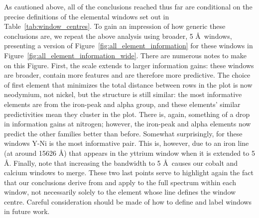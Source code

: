\documentclass[a4paper,fleqn,usenatbib]{mnras}
\begin{document}
As cautioned above, all of the conclusions reached thus far are conditional on the precise definitions of the elemental windows set out in Table~\ref{tab:window_centres}. To gain an impression of how generic these conclusions are, we repeat the above analysis using broader, 5 \AA\ windows, presenting a version of Figure~\ref{fig:all_element_information} for these windows in Figure~\ref{fig:all_element_information_wide}. There are numerous notes to make on this Figure. First, the scale extends to larger information gains: these windows are broader, contain more features and are therefore more predictive. The choice of first element that minimizes the total distance between rows in the plot is now neodymium, not nickel, but the structure is still similar: the most informative elements are from the iron-peak and alpha group, and these elements' similar predictivities mean they cluster in the plot. There is, again, something of a drop in information gains at nitrogen; however, the iron-peak and alpha elements now predict the other families better than before. Somewhat surprisingly, for these windows Y-Ni is the most informative pair. This is, however, due to an iron line (at around 15626 \AA) that appears in the yttrium window when it is extended to 5 \AA. Finally, note that increasing the bandwidth to 5 \AA\ causes our cobalt and calcium windows to merge.
These two last points serve to highlight again the fact that our conclusions derive from and apply to the full spectrum within each window, not necessarily solely to the element whose line defines the window centre. Careful consideration should be made of how to define and label windows in future work.
\end{document}
